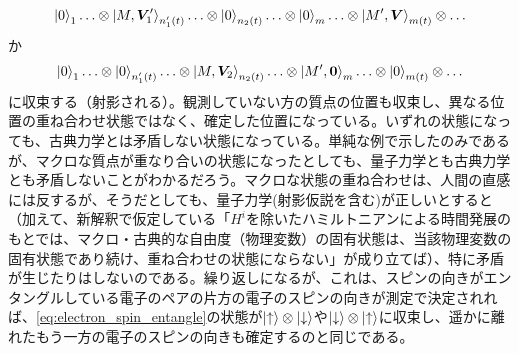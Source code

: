 \begin{equation}
    \ket{0}_1 \ldots \otimes \ket{M,\bm{V}_1'}_{n'_1(t)} \ldots \otimes \ket{0}_{n_2(t)}  \ldots \otimes \ket{0}_m \ldots \otimes \ket{M',\bm{V}}_{m(t)} \otimes\ldots
\end{equation}
か
\begin{equation}
    \ket{0}_1 \ldots \otimes \ket{0}_{n'_1(t)} \ldots \otimes \ket{M,\bm{V}_2}_{n_2(t)}  \ldots \otimes \ket{M',\bm{0}}_m \ldots \otimes \ket{0}_{m(t)} \otimes \ldots 
\end{equation}
に収束する（射影される）。観測していない方の質点の位置も収束し、異なる位置の重ね合わせ状態ではなく、確定した位置になっている。いずれの状態になっても、古典力学とは矛盾しない状態になっている。単純な例で示したのみであるが、マクロな質点が重なり合いの状態になったとしても、量子力学とも古典力学とも矛盾しないことがわかるだろう。マクロな状態の重ね合わせは、人間の直感には反するが、そうだとしても、量子力学(射影仮説を含む)が正しいとすると（加えて、新解釈で仮定している「$H^i$を除いたハミルトニアンによる時間発展のもとでは、マクロ・古典的な自由度（物理変数）の固有状態は、当該物理変数の固有状態であり続け、重ね合わせの状態にならない」が成り立てば）、特に矛盾が生じたりはしないのである。繰り返しになるが、これは、スピンの向きがエンタングルしている電子のペアの片方の電子のスピンの向きが測定で決定されれば、\eqref{eq:electron_spin_entangle}の状態が$\ket{\uparrow} \otimes \ket{\downarrow}$や$\ket{\downarrow} \otimes \ket{\uparrow}$に収束し、遥かに離れたもう一方の電子のスピンの向きも確定するのと同じである。